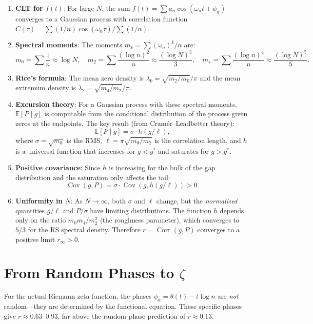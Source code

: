 \documentclass[11pt]{article}
\DeclareMathOperator{\Corr}{Corr}
\DeclareMathOperator{\Cov}{Cov}
\begin{document}
\begin{enumerate}
\item \textbf{CLT for $f(t)$}: For large $N$, the sum $f(t) = \sum a_n \cos(\omega_n t + \phi_n)$
converges to a Gaussian process with correlation function
$C(\tau) = \sum (1/n) \cos(\omega_n \tau) / \sum (1/n)$.

\item \textbf{Spectral moments}: The moments $m_k = \sum (\omega_n)^k / n$ are:
\[
m_0 = \sum \frac{1}{n} \approx \log N, \quad
m_2 = \sum \frac{(\log n)^2}{n} \approx \frac{(\log N)^3}{3}, \quad
m_4 = \sum \frac{(\log n)^4}{n} \approx \frac{(\log N)^5}{5}.
\]

\item \textbf{Rice's formula}: The mean zero density is $\lambda_0 = \sqrt{m_2/m_0}/\pi$
and the mean extremum density is $\lambda_2 = \sqrt{m_4/m_2}/\pi$.

\item \textbf{Excursion theory}: For a Gaussian process with these spectral moments,
$\mathbb{E}[P \mid g]$ is computable from the conditional distribution
of the process given zeros at the endpoints.
The key result (from Cram\'er--Leadbetter theory):
\[
\mathbb{E}[P \mid g] = \sigma \cdot h(g/\ell),
\]
where $\sigma = \sqrt{m_0}$ is the RMS, $\ell = \pi\sqrt{m_0/m_2}$ is the correlation length,
and $h$ is a universal function that increases for $g < g^*$ and saturates for $g > g^*$.

\item \textbf{Positive covariance}: Since $h$ is increasing for the bulk of the gap distribution
and the saturation only affects the tail:
\[
\Cov(g, P) = \sigma \cdot \Cov(g, h(g/\ell)) > 0.
\]

\item \textbf{Uniformity in $N$}: As $N \to \infty$, both $\sigma$ and $\ell$ change, but
the \emph{normalized} quantities $g/\ell$ and $P/\sigma$ have limiting distributions.
The function $h$ depends only on the ratio $m_0 m_4 / m_2^2$ (the roughness parameter),
which converges to $5/3$ for the RS spectral density.
Therefore $r = \Corr(g, P)$ converges to a positive limit $r_\infty > 0$.
\end{enumerate}

\section{From Random Phases to $\zeta$}

For the actual Riemann zeta function, the phases $\phi_n = \theta(t) - t\log n$ are
\emph{not} random---they are determined by the functional equation.
These specific phases give $r \approx 0.63$--$0.93$, far above the random-phase
prediction of $r \approx 0.13$.
\end{document}
